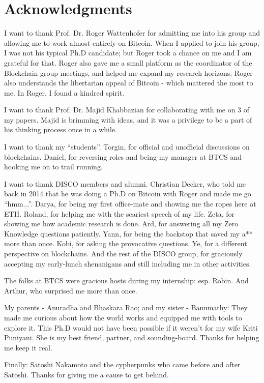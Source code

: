 \chapter*{Acknowledgments}

I want to thank Prof. Dr. Roger Wattenhofer for admitting me into his group and allowing me to work almost entirely on Bitcoin. When I applied to join his group, I was not his typical Ph.D candidate; but Roger took a chance on me and I am grateful for that. Roger also gave me a small platform as the coordinator of the Blockchain group meetings, and helped me expand my research horizons. Roger also understands the libertarian appeal of Bitcoin - which mattered the most to me. In Roger, I found a kindred spirit. 

I want to thank Prof. Dr. Majid Khabbazian for collaborating with me on 3 of my papers. Majid is brimming with ideas, and it was a privilege to be a part of his thinking process once in a while.

I want to thank my ``students''. Torgin, for official and unofficial discussions on blockchains. Daniel, for reversing roles and being my manager at BTCS and hooking me on to trail running. 

I want to thank DISCO members and alumni. Christian Decker, who told me back in 2014 that he was doing a Ph.D on Bitcoin with Roger and made me go ``hmm...''. Darya, for being my first office-mate and showing me the ropes here at ETH. Roland, for helping me with the scariest speech of my life. Zeta, for showing me how academic research is done. Ard, for answering all my Zero Knowledge questions patiently. Yann, for being the backstop that saved my a** more than once. Kobi, for asking the provocative questions. Ye, for a different perspective on blockchains. And the rest of the DISCO group, for graciously accepting my early-lunch shenanigans and still including me in other activities.

The folks at BTCS were gracious hosts during my internship: esp. Robin. And Arthur, who surprised me more than once.

My parents - Anuradha and Bhaskara Rao; and my sister - Banumathy: They made me curious about how the world works and equipped me with tools to explore it. This Ph.D would not have been possible if it weren't for my wife Kriti Puniyani. She is my best friend, partner, and sounding-board. Thanks for helping me keep it real.

Finally: Satoshi Nakamoto and the cypherpunks who came before and after Satoshi. Thanks for giving me a cause \cite{bitcoin_whitepaper} to get behind.

